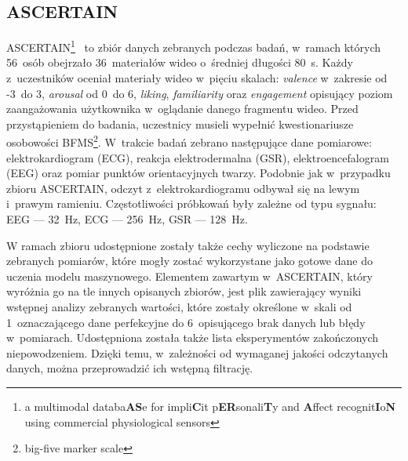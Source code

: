 \subsection{ASCERTAIN}
ASCERTAIN\footnote{a multimodal databa\textbf{AS}e for impli\textbf{C}it p\textbf{ER}sonali\textbf{T}y and \textbf{A}ffect recognit\textbf{I}o\textbf{N} using commercial physiological sensors}~\cite{ascertain_dataset_2016} to zbiór danych zebranych podczas badań, w~ramach których 56~osób obejrzało 36~materiałów wideo o~średniej długości 80~s. Każdy z~uczestników oceniał materiały wideo w~pięciu skalach: \textit{valence} w~zakresie od -3~do 3, \textit{arousal} od 0~do 6, \textit{liking}, \textit{familiarity} oraz \textit{engagement} opisujący poziom zaangażowania użytkownika w~oglądanie danego fragmentu wideo. Przed przystąpieniem do badania, uczestnicy musieli wypełnić kwestionariusze osobowości BFMS\footnote{big-five marker scale}.  W~trakcie badań zebrano następujące dane pomiarowe: elektrokardiogram (ECG), reakcja elektrodermalna (GSR), elektroencefalogram (EEG) oraz pomiar punktów orientacyjnych twarzy. Podobnie jak w~przypadku zbioru ASCERTAIN, odczyt z~elektrokardiogramu odbywał się na lewym i~prawym ramieniu. Częstotliwości próbkowań były zależne od typu sygnału: EEG --- 32~Hz, ECG --- 256~Hz, GSR --- 128~Hz.

W ramach zbioru udostępnione zostały także cechy wyliczone na podstawie zebranych pomiarów, które mogły zostać wykorzystane jako gotowe dane do uczenia modelu maszynowego. Elementem zawartym w~ASCERTAIN, który wyróżnia go na tle innych opisanych zbiorów, jest plik zawierający wyniki wstępnej analizy zebranych wartości, które zostały określone w~skali od 1~oznaczającego dane perfekcyjne do 6~opisującego brak danych lub błędy w~pomiarach.  Udostępniona została także lista eksperymentów zakończonych niepowodzeniem. Dzięki temu, w~zależności od wymaganej jakości odczytanych danych, można przeprowadzić ich wstępną filtrację.

